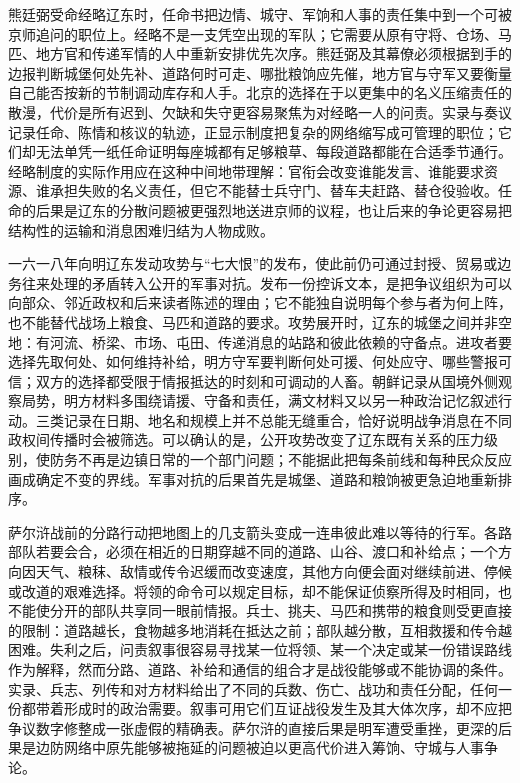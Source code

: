 熊廷弼受命经略辽东时，任命书把边情、城守、军饷和人事的责任集中到一个可被京师追问的职位上。经略不是一支凭空出现的军队；它需要从原有守将、仓场、马匹、地方官和传递军情的人中重新安排优先次序。熊廷弼及其幕僚必须根据到手的边报判断城堡何处先补、道路何时可走、哪批粮饷应先催，地方官与守军又要衡量自己能否按新的节制调动库存和人手。北京的选择在于以更集中的名义压缩责任的散漫，代价是所有迟到、欠缺和失守更容易聚焦为对经略一人的问责。实录与奏议记录任命、陈情和核议的轨迹，正显示制度把复杂的网络缩写成可管理的职位；它们却无法单凭一纸任命证明每座城都有足够粮草、每段道路都能在合适季节通行。经略制度的实际作用应在这种中间地带理解：官衔会改变谁能发言、谁能要求资源、谁承担失败的名义责任，但它不能替士兵守门、替车夫赶路、替仓役验收。任命的后果是辽东的分散问题被更强烈地送进京师的议程，也让后来的争论更容易把结构性的运输和消息困难归结为人物成败。

一六一八年向明辽东发动攻势与“七大恨”的发布，使此前仍可通过封授、贸易或边务往来处理的矛盾转入公开的军事对抗。发布一份控诉文本，是把争议组织为可以向部众、邻近政权和后来读者陈述的理由；它不能独自说明每个参与者为何上阵，也不能替代战场上粮食、马匹和道路的要求。攻势展开时，辽东的城堡之间并非空地：有河流、桥梁、市场、屯田、传递消息的站路和彼此依赖的守备点。进攻者要选择先取何处、如何维持补给，明方守军要判断何处可援、何处应守、哪些警报可信；双方的选择都受限于情报抵达的时刻和可调动的人畜。朝鲜记录从国境外侧观察局势，明方材料多围绕请援、守备和责任，满文材料又以另一种政治记忆叙述行动。三类记录在日期、地名和规模上并不总能无缝重合，恰好说明战争消息在不同政权间传播时会被筛选。可以确认的是，公开攻势改变了辽东既有关系的压力级别，使防务不再是边镇日常的一个部门问题；不能据此把每条前线和每种民众反应画成确定不变的界线。军事对抗的后果首先是城堡、道路和粮饷被更急迫地重新排序。

萨尔浒战前的分路行动把地图上的几支箭头变成一连串彼此难以等待的行军。各路部队若要会合，必须在相近的日期穿越不同的道路、山谷、渡口和补给点；一个方向因天气、粮秣、敌情或传令迟缓而改变速度，其他方向便会面对继续前进、停候或改道的艰难选择。将领的命令可以规定目标，却不能保证侦察所得及时相同，也不能使分开的部队共享同一眼前情报。兵士、挑夫、马匹和携带的粮食则受更直接的限制：道路越长，食物越多地消耗在抵达之前；部队越分散，互相救援和传令越困难。失利之后，问责叙事很容易寻找某一位将领、某一个决定或某一份错误路线作为解释，然而分路、道路、补给和通信的组合才是战役能够或不能协调的条件。实录、兵志、列传和对方材料给出了不同的兵数、伤亡、战功和责任分配，任何一份都带着形成时的政治需要。叙事可用它们互证战役发生及其大体次序，却不应把争议数字修整成一张虚假的精确表。萨尔浒的直接后果是明军遭受重挫，更深的后果是边防网络中原先能够被拖延的问题被迫以更高代价进入筹饷、守城与人事争论。

